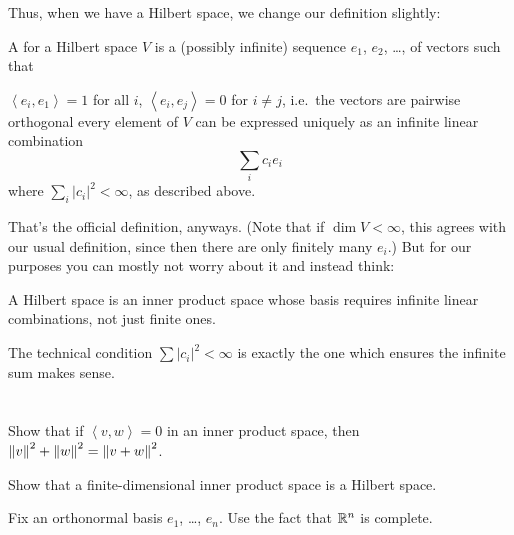 Thus, when we have a Hilbert space, we change our definition slightly:
\begin{definition}
	A  for a Hilbert space $V$
	is a (possibly infinite) sequence $e_1$, $e_2$, \dots,
	of vectors such that
	\begin{itemize}
		\ii $\left< e_i, e_1 \right> = 1$ for all $i$,
		\ii $\left< e_i, e_j \right> = 0$ for $i \ne j$,
		i.e.\ the vectors are pairwise orthogonal
		\ii every element of $V$ can be expressed uniquely as an
		infinite linear combination
		\[ \sum_i c_i e_i \]
		where $\sum_i \left\lvert c_i \right\rvert^2 < \infty$,
		as described above.
	\end{itemize}
\end{definition}
That's the official definition, anyways.
(Note that if $\dim V < \infty$, this agrees with our usual definition,
since then there are only finitely many $e_i$.)
But for our purposes you can mostly not worry about it and instead think:
\begin{moral}
	A Hilbert space is an inner product space
	whose basis requires infinite linear combinations,
	not just finite ones.
\end{moral}
The technical condition $\sum \left\lvert c_i \right\rvert^2 < \infty$
is exactly the one which ensures the infinite sum makes sense.

\section{\problemhead}

\begin{problem}
	Show that if $\left< v,w \right> = 0$ in an inner product space,
	then $\left\lVert v \right\rVert^2 + \left\lVert w \right\rVert^2 = \left\lVert v+w \right\rVert^2$.
\end{problem}

\begin{sproblem}
	Show that a finite-dimensional inner product space
	is a Hilbert space.
	\begin{hint}
		Fix an orthonormal basis $e_1$, \dots, $e_n$.
		Use the fact that $\mathbb R^n$ is complete.
	\end{hint}
\end{sproblem}


